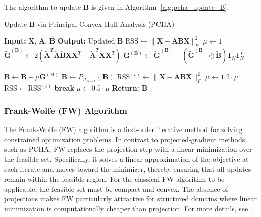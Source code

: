 \documentclass[oneside]{article}
\begin{document}
The algorithm to update $\mathbf{B}$ is given in Algorithm~\ref{alg:pcha_update_B}.

\begin{algorithm}[H]
    \caption{Update $\mathbf{B}$ via Principal Convex Hull Analysis (PCHA)}
    \label{alg:pcha_update_B}
    \begin{algorithmic}[1]
        \State \textbf{Input:} $\mathbf{X}$, $\tilde{\mathbf{A}}$, $\tilde{\mathbf{B}}$
        \State \textbf{Output:} Updated $\mathbf{B}$
        \State $\text{RSS} \gets \| \mathbf{X} - \tilde{\mathbf{A}} \tilde{\mathbf{B}} \mathbf{X} \|_F^2$
        \State $\mu \gets 1$
                \State $\tilde{\mathbf{G}}^{(\mathbf{B})} \gets 2 \left( \tilde{\mathbf{A}}^T \tilde{\mathbf{A}} \tilde{\mathbf{B}} \mathbf{X} \mathbf{X}^T - \tilde{\mathbf{A}}^T \mathbf{X} \mathbf{X}^T \right)$
                \State $\mathbf{G}^{(\mathbf{B})} \gets \tilde{\mathbf{G}}^{(\mathbf{B})} - \left( \tilde{\mathbf{G}}^{(\mathbf{B})} \odot \tilde{\mathbf{B}} \right) \mathbf{1}_N \mathbf{1}_N^T$

             
                \State $\mathbf{B} \gets \mathbf{B} - \mu \mathbf{G}^{(\mathbf{B})}$
                \State $\tilde{\mathbf{B}} \gets P_{\Delta_{N-1}}(\mathbf{B})$
                \State $\text{RSS}^{(t)} \gets \| \mathbf{X} - \tilde{\mathbf{A}} \tilde{\mathbf{B}} \mathbf{X} \|_F^2$
                    \State $\mu \gets 1.2 \cdot \mu$
                    \State $\text{RSS} \gets \text{RSS}^{(t)}$
                    \State \textbf{break}
                \Else
                    \State $\mu \gets 0.5 \cdot \mu$
                \EndIf
                \EndFor
        \EndFor
    \State \textbf{Return:} $\tilde{\mathbf{B}}$
    \end{algorithmic}
\end{algorithm}

\subsubsection{Frank-Wolfe (FW) Algorithm}
\label{subsec:frank_wolfe}

The Frank-Wolfe (FW) algorithm is a first-order iterative method for solving constrained optimization problems. In contrast to projected-gradient methods, such as PCHA, FW replaces the projection step with a linear minimization over the feasible set. Specifically, it solves a linear approximation of the objective at each iterate and moves toward the minimizer, thereby ensuring that all updates remain within the feasible region. For the classical FW algorithm to be applicable, the feasible set must be compact and convex. The absence of projections makes FW particularly attractive for structured domains where linear minimization is computationally cheaper than projection. For more details, see \autocite{frankAlgorithmQuadraticProgramming1956a, clarksonCoresetsSparseGreedy2010, jaggiRevisitingFrankWolfeProjectionFree2013, bauckhageArchetypalAnalysisAutoencoder2015}.
\end{document}
